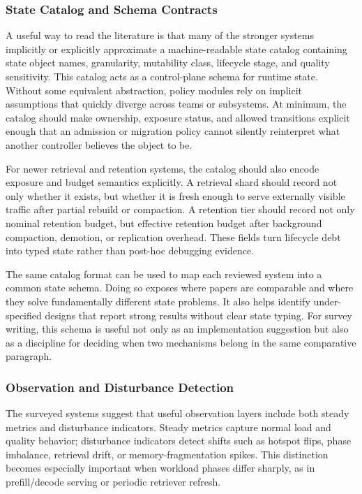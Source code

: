 \documentclass[acmsmall,screen,review]{acmart}
\begin{document}
\subsubsection{State Catalog and Schema Contracts}

A useful way to read the literature is that many of the stronger systems implicitly or explicitly approximate a machine-readable state catalog containing state object names, granularity, mutability class, lifecycle stage, and quality sensitivity. This catalog acts as a control-plane schema for runtime state. Without some equivalent abstraction, policy modules rely on implicit assumptions that quickly diverge across teams or subsystems. At minimum, the catalog should make ownership, exposure status, and allowed transitions explicit enough that an admission or migration policy cannot silently reinterpret what another controller believes the object to be.

For newer retrieval and retention systems, the catalog should also encode exposure and budget semantics explicitly. A retrieval shard should record not only whether it exists, but whether it is fresh enough to serve externally visible traffic after partial rebuild or compaction. A retention tier should record not only nominal retention budget, but effective retention budget after background compaction, demotion, or replication overhead. These fields turn lifecycle debt into typed state rather than post-hoc debugging evidence.

The same catalog format can be used to map each reviewed system into a common state schema. Doing so exposes where papers are comparable and where they solve fundamentally different state problems. It also helps identify under-specified designs that report strong results without clear state typing. For survey writing, this schema is useful not only as an implementation suggestion but also as a discipline for deciding when two mechanisms belong in the same comparative paragraph.

\subsubsection{Observation and Disturbance Detection}

The surveyed systems suggest that useful observation layers include both steady metrics and disturbance indicators. Steady metrics capture normal load and quality behavior; disturbance indicators detect shifts such as hotspot flips, phase imbalance, retrieval drift, or memory-fragmentation spikes. This distinction becomes especially important when workload phases differ sharply, as in prefill/decode serving or periodic retriever refresh.
\end{document}
